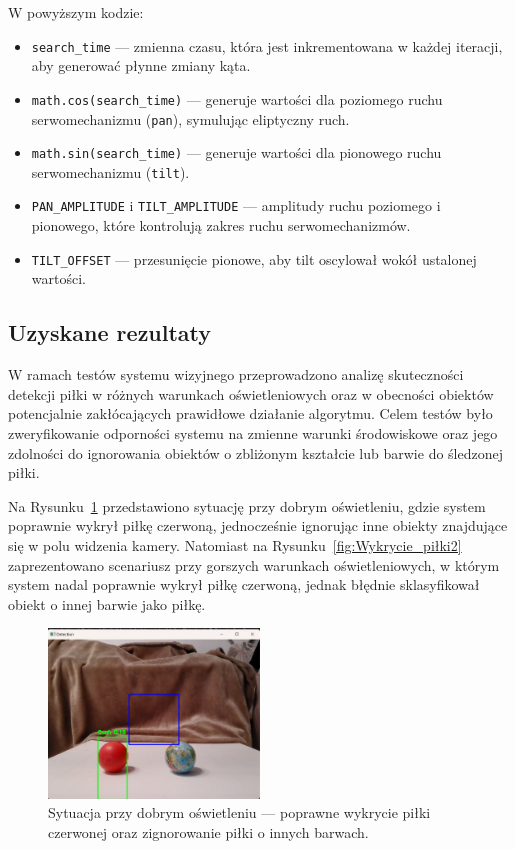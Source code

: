 \documentclass[a4paper,twoside,12pt]{book}
\begin{document}
W powyższym kodzie:
\begin{itemize}
    \item \texttt{search\_time} — zmienna czasu, która jest inkrementowana w każdej iteracji, aby generować płynne zmiany kąta.
    \item \texttt{math.cos(search\_time)} — generuje wartości dla poziomego ruchu serwomechanizmu (\texttt{pan}), symulując eliptyczny ruch.
    \item \texttt{math.sin(search\_time)} — generuje wartości dla pionowego ruchu serwomechanizmu (\texttt{tilt}).
    \item \texttt{PAN\_AMPLITUDE} i \texttt{TILT\_AMPLITUDE} — amplitudy ruchu poziomego i pionowego, które kontrolują zakres ruchu serwomechanizmów.
    \item \texttt{TILT\_OFFSET} — przesunięcie pionowe, aby tilt oscylował wokół ustalonej wartości.
\end{itemize}

\newpage
\subsection{Uzyskane rezultaty}
W ramach testów systemu wizyjnego przeprowadzono analizę skuteczności detekcji piłki w różnych warunkach oświetleniowych oraz w obecności obiektów potencjalnie zakłócających prawidłowe działanie algorytmu. Celem testów było zweryfikowanie odporności systemu na zmienne warunki środowiskowe oraz jego zdolności do ignorowania obiektów o zbliżonym kształcie lub barwie do śledzonej piłki.

Na Rysunku~\ref{fig:Wykrycie_piłki1} przedstawiono sytuację przy dobrym oświetleniu, gdzie system poprawnie wykrył piłkę czerwoną, jednocześnie ignorując inne obiekty znajdujące się w polu widzenia kamery. Natomiast na Rysunku~\ref{fig:Wykrycie_piłki2} zaprezentowano scenariusz przy gorszych warunkach oświetleniowych, w którym system nadal poprawnie wykrył piłkę czerwoną, jednak błędnie sklasyfikował obiekt o innej barwie jako piłkę.

\begin{figure}[!hb]
    \centering
    \includegraphics[width=0.5\textwidth]{Images/Porownanie/Yolo7 robot/Zrzut ekranu 2025-01-02 194147.png}
    \caption{Sytuacja przy dobrym oświetleniu — poprawne wykrycie piłki czerwonej oraz zignorowanie piłki o innych barwach.}
    \label{fig:Wykrycie_piłki1}
\end{figure}
\end{document}

